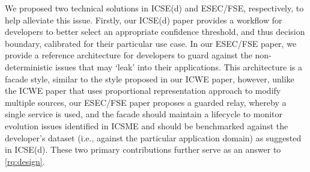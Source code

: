 We proposed two technical solutions in ICSE(d) and ESEC/FSE, respectively, to help alleviate this issue.  Firstly, our ICSE(d) paper provides a workflow for developers to better select an appropriate confidence threshold, and thus decision boundary, calibrated for their particular use case. In our ESEC/FSE paper, we provide a reference architecture for developers to guard against the non-deterministic issues that may `leak' into their applications. This architecture is a facade style, similar to the style proposed in our ICWE paper, however, unlike the ICWE paper that uses proportional representation approach to modify multiple sources, our ESEC/FSE paper proposes a guarded relay, whereby a single service is used, and the facade should maintain a lifecycle to monitor evolution issues identified in ICSME and should be benchmarked against the developer's dataset (i.e., against the particular application domain) as suggested in ICSE(d). These two primary contributions further serve as an answer to \ref{rq:design}.

